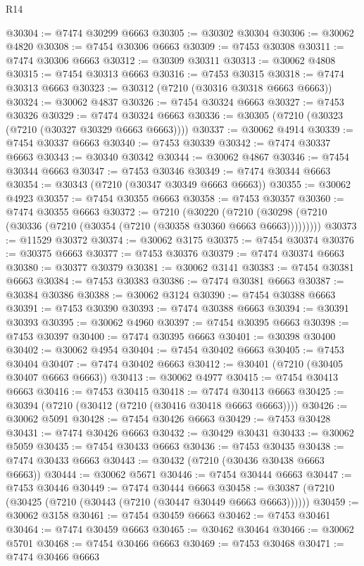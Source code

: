 \begin{lexlean}{R14}
\begin{coremodule}
@30304 := @7474 @30299 @6663
@30305 := @30302 @30304
@30306 := @30062 @4820
@30308 := @7454 @30306 @6663
@30309 := @7453 @30308
@30311 := @7474 @30306 @6663
@30312 := @30309 @30311
@30313 := @30062 @4808
@30315 := @7454 @30313 @6663
@30316 := @7453 @30315
@30318 := @7474 @30313 @6663
@30323 := @30312 (@7210 (@30316 @30318 @6663 @6663))
@30324 := @30062 @4837
@30326 := @7454 @30324 @6663
@30327 := @7453 @30326
@30329 := @7474 @30324 @6663
@30336 := @30305 (@7210 (@30323 (@7210 (@30327 @30329 @6663 @6663))))
@30337 := @30062 @4914
@30339 := @7454 @30337 @6663
@30340 := @7453 @30339
@30342 := @7474 @30337 @6663
@30343 := @30340 @30342
@30344 := @30062 @4867
@30346 := @7454 @30344 @6663
@30347 := @7453 @30346
@30349 := @7474 @30344 @6663
@30354 := @30343 (@7210 (@30347 @30349 @6663 @6663))
@30355 := @30062 @4923
@30357 := @7454 @30355 @6663
@30358 := @7453 @30357
@30360 := @7474 @30355 @6663
@30372 := @7210
    (@30220 (@7210 (@30298 (@7210 (@30336 (@7210 (@30354 (@7210 (@30358 @30360 @6663 @6663)))))))))
@30373 := @11529 @30372
@30374 := @30062 @3175
@30375 := @7454 @30374
@30376 := @30375 @6663
@30377 := @7453 @30376
@30379 := @7474 @30374 @6663
@30380 := @30377 @30379
@30381 := @30062 @3141
@30383 := @7454 @30381 @6663
@30384 := @7453 @30383
@30386 := @7474 @30381 @6663
@30387 := @30384 @30386
@30388 := @30062 @3124
@30390 := @7454 @30388 @6663
@30391 := @7453 @30390
@30393 := @7474 @30388 @6663
@30394 := @30391 @30393
@30395 := @30062 @4960
@30397 := @7454 @30395 @6663
@30398 := @7453 @30397
@30400 := @7474 @30395 @6663
@30401 := @30398 @30400
@30402 := @30062 @4954
@30404 := @7454 @30402 @6663
@30405 := @7453 @30404
@30407 := @7474 @30402 @6663
@30412 := @30401 (@7210 (@30405 @30407 @6663 @6663))
@30413 := @30062 @4977
@30415 := @7454 @30413 @6663
@30416 := @7453 @30415
@30418 := @7474 @30413 @6663
@30425 := @30394 (@7210 (@30412 (@7210 (@30416 @30418 @6663 @6663))))
@30426 := @30062 @5091
@30428 := @7454 @30426 @6663
@30429 := @7453 @30428
@30431 := @7474 @30426 @6663
@30432 := @30429 @30431
@30433 := @30062 @5059
@30435 := @7454 @30433 @6663
@30436 := @7453 @30435
@30438 := @7474 @30433 @6663
@30443 := @30432 (@7210 (@30436 @30438 @6663 @6663))
@30444 := @30062 @5671
@30446 := @7454 @30444 @6663
@30447 := @7453 @30446
@30449 := @7474 @30444 @6663
@30458 := @30387 (@7210 (@30425 (@7210 (@30443 (@7210 (@30447 @30449 @6663 @6663))))))
@30459 := @30062 @3158
@30461 := @7454 @30459 @6663
@30462 := @7453 @30461
@30464 := @7474 @30459 @6663
@30465 := @30462 @30464
@30466 := @30062 @5701
@30468 := @7454 @30466 @6663
@30469 := @7453 @30468
@30471 := @7474 @30466 @6663

\end{coremodule}
\end{lexlean}
